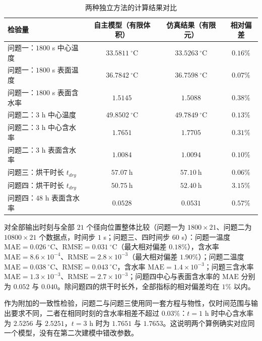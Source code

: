\documentclass[12pt,a4paper]{article}
\begin{document}
\begin{center}
\begin{table}[H]
\centering
\caption{两种独立方法的计算结果对比}
\label{tab:verify-comsol}
\begin{tabular}{lccc}
\toprule
检验量 & 自主模型（有限体积） & 仿真结果（有限元） & 相对偏差\\
\midrule
问题一：$1800$ s 中心温度 & $33.5811\ \mathrm{^\circ C}$ & $33.5263\ \mathrm{^\circ C}$ & $0.16\%$\\
问题一：$1800$ s 表面温度 & $36.7842\ \mathrm{^\circ C}$ & $36.7598\ \mathrm{^\circ C}$ & $0.07\%$\\
问题一：$1800$ s 表面含水率 & $1.5145$ & $1.5088$ & $0.38\%$\\
问题二：$3$ h 中心温度 & $49.8502\ \mathrm{^\circ C}$ & $49.7849\ \mathrm{^\circ C}$ & $0.13\%$\\
问题二：$3$ h 中心含水率 & $1.7651$ & $1.7705$ & $0.31\%$\\
问题二：$3$ h 表面含水率 & $1.0084$ & $1.0094$ & $0.10\%$\\
问题三：烘干时长 $t_{dry}$ & $57.07\ \mathrm{h}$ & $57.10\ \mathrm{h}$ & $0.06\%$\\
问题四：烘干时长 $t_{dry}$ & $50.75\ \mathrm{h}$ & $52.40\ \mathrm{h}$ & $3.15\%$\\
问题四：$48$ h 表面含水率 & $0.0528$ & $0.0531$ & $0.57\%$\\
\bottomrule
\end{tabular}
\end{table}

对全部输出时刻与全部 $21$ 个径向位置整体比较（问题一为 $1800\times21$、问题二为 $10800\times21$ 个数据点，时间步 $1$ s；问题三、四时间步 $60$ s）：问题一温度 $\mathrm{MAE}=0.026\ \mathrm{^\circ C}$、$\mathrm{RMSE}=0.031\ \mathrm{^\circ C}$（最大相对偏差 $0.18\%$），含水率 $\mathrm{MAE}=8.6\times10^{-4}$、$\mathrm{RMSE}=2.8\times10^{-3}$（最大相对偏差 $1.90\%$）；问题二温度 $\mathrm{MAE}=0.038\ \mathrm{^\circ C}$、$\mathrm{RMSE}=0.043\ \mathrm{^\circ C}$，含水率 $\mathrm{MAE}=1.4\times10^{-3}$；问题三含水率 $\mathrm{MAE}=1.3\times10^{-3}$、$\mathrm{RMSE}=2.7\times10^{-3}$；问题四中心与表面含水率的 $\mathrm{MAE}$ 分别为 $0.052$ 与 $0.040$。除问题四的烘干时长外，全部指标的相对偏差均在 $1\%$ 以内。

作为附加的一致性检验，问题二与问题三使用同一套方程与物性，仅时间范围与输出要求不同，二者在相同时刻的含水率相差不超过 $0.03\%$：$t=1$ h 时中心含水率为 $2.5256$ 与 $2.5251$，$t=3$ h 时为 $1.7651$ 与 $1.7653$。这说明两个算例确实对应同一个模型，没有在第二次建模中错改参数。


\end{center}
\end{document}
